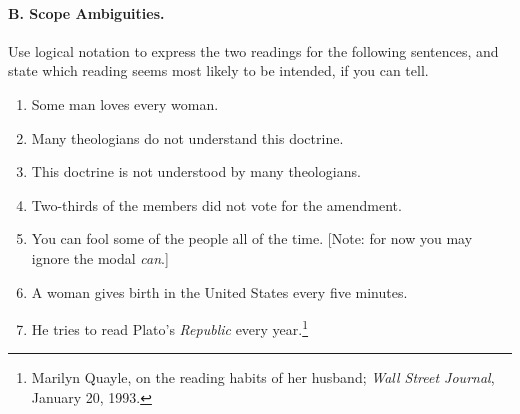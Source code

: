{{\paragraph*{B. Scope Ambiguities.}

Use logical notation to express the two readings for the following sentences, and state which reading seems most likely to be intended, if you can tell.

\begin{enumerate}

\item Some man loves every woman.
\item Many theologians do not understand this doctrine.
\item This doctrine is not understood by many theologians.
\item Two-thirds of the members did not vote for the amendment.
\item You can fool some of the people all of the time. [Note: for now you may ignore the modal \textit{can}.]
\item A woman gives birth in the United States every five minutes.
\item He tries to read Plato’s \textit{Republic} every year.\footnote{Marilyn Quayle, on the reading habits of her husband; \textit{Wall Street Journal}, January 20, 1993.}
\end{enumerate}

}
\largerpage[2.5]
}
